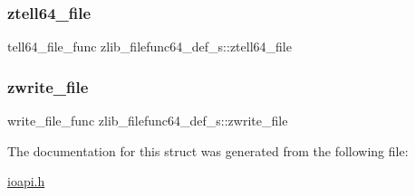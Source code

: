 \subsubsection{\texorpdfstring{ztell64\+\_\+file}{ztell64\_file}}
{\footnotesize\ttfamily tell64\+\_\+file\+\_\+func zlib\+\_\+filefunc64\+\_\+def\+\_\+s\+::ztell64\+\_\+file}

\mbox{\label{structzlib__filefunc64__def__s_a04f5366c9e7e48343357bb88b46998f9}} 
\subsubsection{\texorpdfstring{zwrite\+\_\+file}{zwrite\_file}}
{\footnotesize\ttfamily write\+\_\+file\+\_\+func zlib\+\_\+filefunc64\+\_\+def\+\_\+s\+::zwrite\+\_\+file}



The documentation for this struct was generated from the following file\+:\begin{DoxyCompactItemize}
\item 
\hyperlink{ioapi_8h}{ioapi.\+h}\end{DoxyCompactItemize}
